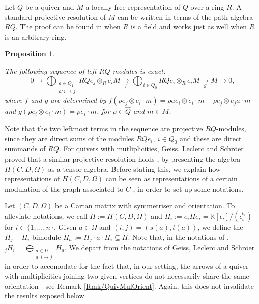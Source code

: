 \documentclass[11pt,english]{article}
\numberwithin{equation}{section}
\numberwithin{figure}{section}
\theoremstyle{definition}
\theoremstyle{plain}
\newtheorem{prop}[df]{Proposition}
\theoremstyle{remark}
\newcommand\KK{\mathbb{K}}
\begin{document}
Let $Q$ be a quiver and $M$ a locally free representation of $Q$
over a ring $R$. A standard projective resolution of $M$ can be
written in terms of the path algebra $RQ$. The proof can be found
in \cite[\S 1.]{CB92} when $R$ is a field and works just as well
when $R$ is an arbitrary ring.

\begin{prop}{\cite[\S 1.]{CB92}}

The following sequence of left $RQ$-modules is exact:\[
0\rightarrow\bigoplus_{\substack{a\in Q_1 \\ a:i\rightarrow j}}RQe_j\otimes_Re_iM
\underset{f}{\rightarrow}\bigoplus_{i\in Q_0}RQe_i\otimes_Re_iM
\underset{g}{\rightarrow} M\rightarrow 0,
\]where $f$ and $g$ are determined by $f(\rho e_{j}\otimes e_{i}\cdot m)=\rho ae_{i}\otimes e_{i}\cdot m-\rho e_{j}\otimes e_{j}a\cdot m$
and $g(\rho e_{i}\otimes e_{i}\cdot m)=\rho e_{i}\cdot m$, for $\rho\in\hat{Q}$
and $m\in M$.

\end{prop}

Note that the two leftmost terms in the sequence are projective $RQ$-modules,
since they are direct sums of the modules $RQe_{i},\ i\in Q_{0}$
and these are direct summands of $RQ$. For quivers with mutliplicities,
Geiss, Leclerc and Schröer proved that a similar projective resolution
holds \cite[\S 7.]{GLS17a}, by presenting the algebra $H(C,D,\Omega)$
as a tensor algebra. Before stating this, we explain how representations
of $H(C,D,\Omega)$ can be seen as representations of a certain modulation
of the graph associated to $C$ \cite[\S 5.]{GLS17a}, in order to
set up some notations.

Let $(C,D,\Omega)$ be a Cartan matrix with symmetriser and orientation.
To alleviate notations, we call $H:=H(C,D,\Omega)$ and $H_{i}:=e_{i}He_{i}=\KK[\epsilon_{i}]/(\epsilon_{i}^{c_{i}})$
for $i\in\{1,\ldots,n\}$. Given $a\in\Omega$ and $(i,j)=(s(a),t(a))$,
we define the $H_{j}-H_{i}$-bimodule $H_{a}:=H_{j}\cdot a\cdot H_{i}\subseteq H$.
Note that, in the notations of \cite[\S 5.]{GLS17a}, $_{j}H_{i}=\bigoplus_{\substack{a\in\Omega\\
a:i\rightarrow j
}
}H_{a}$. We depart from the notations of Geiss, Leclerc and Schröer in order
to accomodate for the fact that, in our setting, the arrows of a quiver
with multiplicities joining two given vertices do not necessarily
share the same orientation - see Remark \ref{Rmk/QuivMulOrient}.
Again, this does not invalidate the results exposed below.
\end{document}
